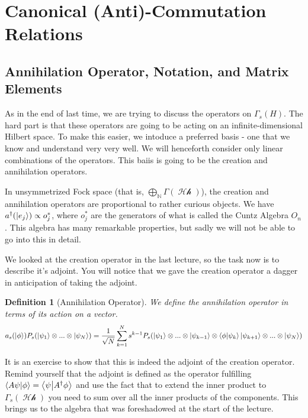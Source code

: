 \documentclass{article}
\DeclareMathOperator{\Hh}{\mathcal{Hh}}
\DeclareMathOperator{\NN}{\mathbb{N}}
\newtheorem{defn}{Definition}
\begin{document}


\section{Canonical (Anti)-Commutation Relations}
\subsection{Annihilation Operator, Notation, and Matrix Elements}
As in the end of last time, we are trying to discuss the operators on $\Gamma_s(H)$. The hard part is that these operators are going to be acting on an infinite-dimensional Hilbert space. To make this easier, we intoduce a preferred basis - one that we know and understand very very well. We will henceforth consider only linear combinations of the operators. This baiis is going to be the creation and annihilation operators.

In unsymmetrized Fock space (that is, $\bigoplus_{\NN} \Gamma(\Hh)$), the creation and annihilation operators are proportional to rather curious objects. We have $a^\dagger(\ket{e_j}) \propto o^*_j$, where $o_j^*$ are the generators of what is called the Cuntz Algebra $O_n$. This algebra has many remarkable properties, but sadly we will not be able to go into this in detail.

We looked at the creation operator in the last lecture, so the task now is to describe it's adjoint. You will notice that we gave the creation operator a dagger in anticipation of taking the adjoint. 

\begin{defn}[Annihilation Operator] We define the annihilation operator in terms of its action on a vector.
\begin{equation}
a_s(\ket{\phi})P_s(\ket{\psi_1}\otimes...\otimes\ket{\psi_N})
= \frac{1}{\sqrt{N}}\sum_{k=1}^N s^{k-1} P_s(\ket{\psi_1}\otimes...\otimes\ket{\psi_{k-1}}\otimes\braket{\phi}{\psi_k}\ket{\psi_{k+1}}\otimes...\otimes\ket{\psi_N})
\end{equation}
\end{defn}

It is an exercise to show that this is indeed the adjoint of the creation operator. Remind yourself that the adjoint is defined as the operator fulfilling $\braket{A\psi}{\phi}=\braket{\psi}{A^\dagger \phi}$ and use the fact that to extend the inner product to $\Gamma_s(\Hh)$ you need to sum over all the inner products of the components. This brings us to the algebra that was foreshadowed at the start of the lecture.
\end{document}
